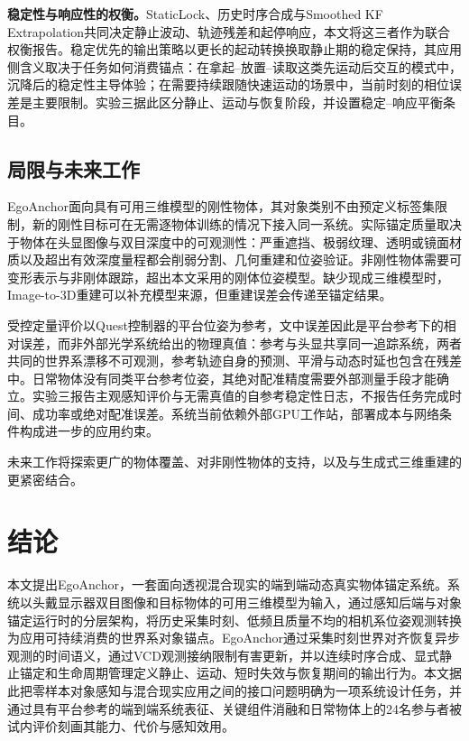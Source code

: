 \documentclass[review]{vgtc}
\begin{document}
\textbf{稳定性与响应性的权衡。}StaticLock、历史时序合成与Smoothed KF Extrapolation共同决定静止波动、轨迹残差和起停响应，本文将这三者作为联合权衡报告。稳定优先的输出策略以更长的起动转换换取静止期的稳定保持，其应用侧含义取决于任务如何消费锚点：在拿起--放置--读取这类先运动后交互的模式中，沉降后的稳定性主导体验；在需要持续跟随快速运动的场景中，当前时刻的相位误差是主要限制。实验三据此区分静止、运动与恢复阶段，并设置稳定--响应平衡条目。

\subsection{局限与未来工作}

EgoAnchor面向具有可用三维模型的刚性物体，其对象类别不由预定义标签集限制，新的刚性目标可在无需逐物体训练的情况下接入同一系统。实际锚定质量取决于物体在头显图像与双目深度中的可观测性：严重遮挡、极弱纹理、透明或镜面材质以及超出有效深度量程都会削弱分割、几何重建和位姿验证。非刚性物体需要可变形表示与非刚体跟踪，超出本文采用的刚体位姿模型。缺少现成三维模型时，Image-to-3D重建可以补充模型来源，但重建误差会传递至锚定结果。

受控定量评价以Quest控制器的平台位姿为参考，文中误差因此是平台参考下的相对误差，而非外部光学系统给出的物理真值：参考与头显共享同一追踪系统，两者共同的世界系漂移不可观测，参考轨迹自身的预测、平滑与动态时延也包含在残差中。日常物体没有同类平台参考位姿，其绝对配准精度需要外部测量手段才能确立。实验三报告主观感知评价与无需真值的自参考稳定性日志，不报告任务完成时间、成功率或绝对配准误差。系统当前依赖外部GPU工作站，部署成本与网络条件构成进一步的应用约束。

未来工作将探索更广的物体覆盖、对非刚性物体的支持，以及与生成式三维重建的更紧密结合。

\section{结论}\label{sec:conclusion}

本文提出EgoAnchor，一套面向透视混合现实的端到端动态真实物体锚定系统。系统以头戴显示器双目图像和目标物体的可用三维模型为输入，通过感知后端与对象锚定运行时的分层架构，将历史采集时刻、低频且质量不均的相机系位姿观测转换为应用可持续消费的世界系对象锚点。EgoAnchor通过采集时刻世界对齐恢复异步观测的时间语义，通过VCD观测接纳限制有害更新，并以连续时序合成、显式静止锚定和生命周期管理定义静止、运动、短时失效与恢复期间的输出行为。本文据此把零样本对象感知与混合现实应用之间的接口问题明确为一项系统设计任务，并通过具有平台参考的端到端系统表征、关键组件消融和日常物体上的24名参与者被试内评价刻画其能力、代价与感知效用。

\clearpage
\raggedbottom



\end{document}
